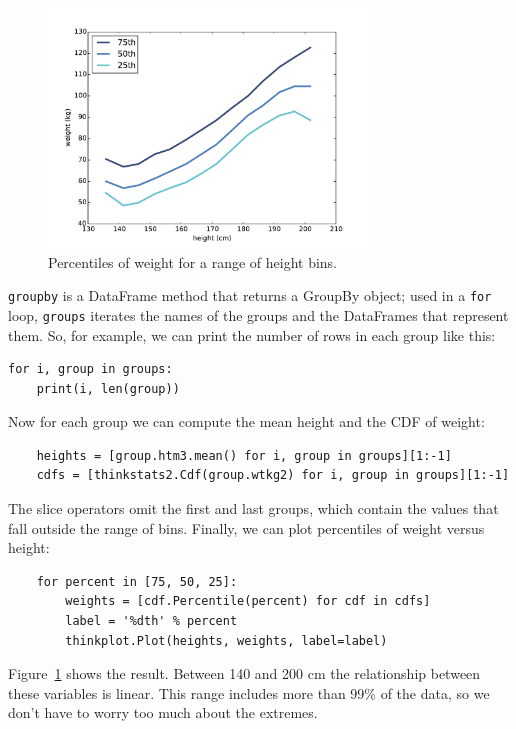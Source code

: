 \documentclass[12pt]{book}
\begin{document}
\begin{figure}
\centerline{\includegraphics[height=2.5in]{figs/scatter3.pdf}}
\caption{Percentiles of weight for a range of height bins.}
\label{scatter3}
\end{figure}

{\tt groupby} is a DataFrame method that returns a GroupBy object;
used in a {\tt for} loop, {\tt groups} iterates the names of the groups
and the DataFrames that represent them.  So, for example, we can
print the number of rows in each group like this:

\begin{verbatim}
for i, group in groups:
    print(i, len(group))
\end{verbatim}

Now for each group we can compute the mean height and the CDF
of weight:

\begin{verbatim}
    heights = [group.htm3.mean() for i, group in groups][1:-1]
    cdfs = [thinkstats2.Cdf(group.wtkg2) for i, group in groups][1:-1]
\end{verbatim}

The slice operators omit the first and last groups, which contain
the values that fall outside the range of bins.  Finally, we can
plot percentiles of weight versus height:

\begin{verbatim}
    for percent in [75, 50, 25]:
        weights = [cdf.Percentile(percent) for cdf in cdfs]
        label = '%dth' % percent
        thinkplot.Plot(heights, weights, label=label)
\end{verbatim}

Figure~\ref{scatter3} shows the result.  Between 140 and 200 cm
the relationship between these variables is linear.  This range
includes more than 99\% of the data, so we don't have to worry
too much about the extremes.
\end{document}
